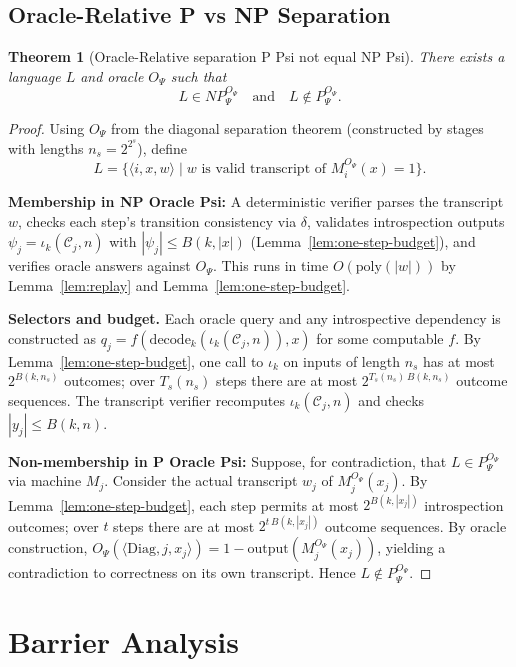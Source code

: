 \documentclass[11pt]{article}
\newtheorem{theorem}{Theorem}[section]
\theoremstyle{plain}
\theoremstyle{definition}
\newcommand{\len}[1]{\left|#1\right|}
\begin{document}
\subsection{Oracle-Relative P vs NP Separation}

\begin{theorem}[Oracle-Relative separation P Psi not equal NP Psi]
\label{thm:separation}
There exists a language $L$ and oracle $O_\Psi$ such that
\[
L \in NP^{O_\Psi}_\Psi \quad\text{and}\quad L \notin P^{O_\Psi}_\Psi.
\]
\end{theorem}

\begin{proof}
Using $O_\Psi$ from the diagonal separation theorem (constructed by stages with lengths $n_s=2^{2^s}$), define
$$L = \{\langle i, x, w \rangle \mid w \text{ is valid transcript of } M_i^{O_\Psi}(x) = 1\}.$$

\textbf{Membership in NP Oracle Psi:}
A deterministic verifier parses the transcript $w$, checks each step's transition consistency via $\delta$, validates introspection outputs $\psi_j=\iota_k(\mathcal{C}_j,n)$ with $|\psi_j|\le B(k,\len{x})$ (Lemma~\ref{lem:one-step-budget}), and verifies oracle answers against $O_\Psi$. This runs in time $O(\mathrm{poly}(|w|))$ by Lemma~\ref{lem:replay} and Lemma~\ref{lem:one-step-budget}.

\noindent\textbf{Selectors and budget.} Each oracle query and any introspective dependency is constructed as $q_j = f(\mathrm{decode}_k(\iota_k(\mathcal{C}_j,n)), x)$ for some computable $f$. By Lemma~\ref{lem:one-step-budget}, one call to $\iota_k$ on inputs of length $n_s$ has at most $2^{B(k,n_s)}$ outcomes; over $T_s(n_s)$ steps there are at most $2^{T_s(n_s)\,B(k,n_s)}$ outcome sequences. The transcript verifier recomputes $\iota_k(\mathcal{C}_j,n)$ and checks $|y_j|\le B(k,n)$.

\textbf{Non-membership in P Oracle Psi:}
Suppose, for contradiction, that $L \in P^{O_\Psi}_\Psi$ via machine $M_j$. Consider the actual transcript $w_j$ of $M_j^{O_\Psi}(x_j)$. By Lemma~\ref{lem:one-step-budget}, each step permits at most $2^{B(k,\len{x_j})}$ introspection outcomes; over $t$ steps there are at most $2^{t\,B(k,\len{x_j})}$ outcome sequences. By oracle construction, $O_\Psi(\langle \text{Diag}, j, x_j \rangle) = 1 - \text{output}(M_j^{O_\Psi}(x_j))$, yielding a contradiction to correctness on its own transcript. Hence $L \notin P^{O_\Psi}_\Psi$.
\end{proof}

\section{Barrier Analysis}
\end{document}
